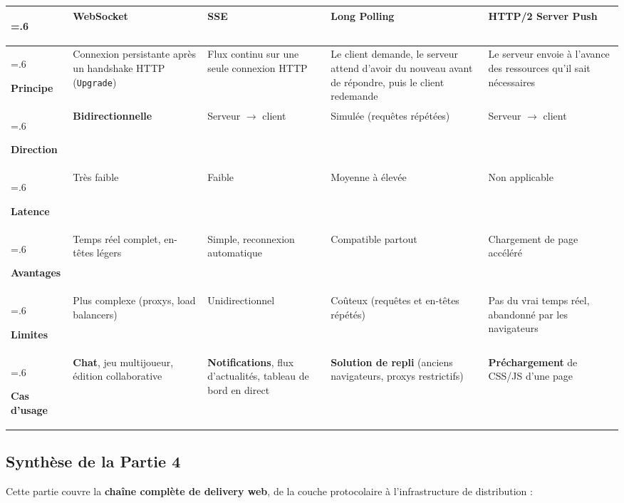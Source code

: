 \documentclass[12pt,a4paper]{article}
\begin{document}
\begin{table}[H]
\centering
\footnotesize
\setlength{\tabcolsep}{4pt}
\begin{tabularx}{\textwidth}{@{}>{\hsize=.6\hsize\raggedright\arraybackslash\bfseries}X >{\hsize=1.1\hsize\raggedright\arraybackslash}X >{\hsize=1.1\hsize\raggedright\arraybackslash}X >{\hsize=1.1\hsize\raggedright\arraybackslash}X >{\hsize=1.1\hsize\raggedright\arraybackslash}X@{}}
\toprule
 & \textbf{WebSocket} & \textbf{SSE} & \textbf{Long Polling} & \textbf{HTTP/2 Server Push} \\
\midrule
Principe & Connexion persistante apr\`es un handshake HTTP (\texttt{Upgrade}) & Flux continu sur une seule connexion HTTP & Le client demande, le serveur attend d'avoir du nouveau avant de r\'epondre, puis le client redemande & Le serveur envoie \`a l'avance des ressources qu'il sait n\'ecessaires \\
Direction & \textbf{Bidirectionnelle} & Serveur $\rightarrow$ client & Simul\'ee (requ\^etes r\'ep\'et\'ees) & Serveur $\rightarrow$ client \\
Latence & Tr\`es faible & Faible & Moyenne \`a \'elev\'ee & Non applicable \\
Avantages & Temps r\'eel complet, en-t\^etes l\'egers & Simple, reconnexion automatique & Compatible partout & Chargement de page acc\'el\'er\'e \\
Limites & Plus complexe (proxys, load balancers) & Unidirectionnel & Co\^uteux (requ\^etes et en-t\^etes r\'ep\'et\'es) & Pas du vrai temps r\'eel, abandonn\'e par les navigateurs \\
\midrule
Cas d'usage & \textbf{Chat}, jeu multijoueur, \'edition collaborative & \textbf{Notifications}, flux d'actualit\'es, tableau de bord en direct & \textbf{Solution de repli} (anciens navigateurs, proxys restrictifs) & \textbf{Pr\'echargement} de CSS/JS d'une page \\
\bottomrule
\end{tabularx}
\end{table}

\subsection*{Synth\`ese de la Partie 4}

Cette partie couvre la \textbf{cha\^ine compl\`ete de delivery web}, de la couche protocolaire \`a l'infrastructure de distribution :
\end{document}
